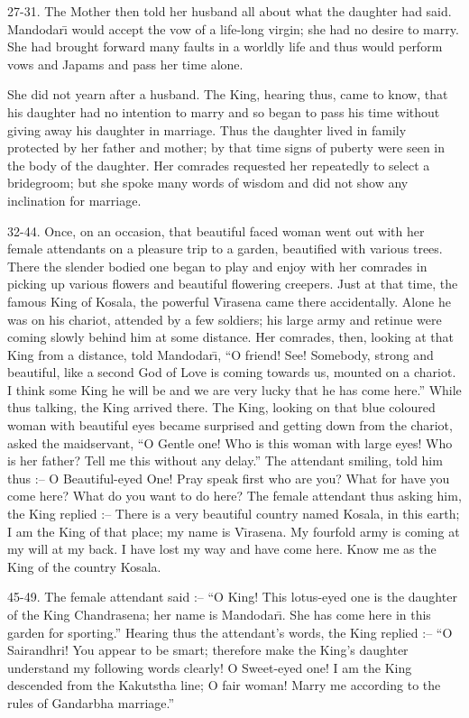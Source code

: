 27-31. The Mother then told her husband all about what the daughter had said. Mandodar\={\i} would accept the vow of a life-long virgin; she had no desire to marry. She had brought forward many faults in a worldly life and thus would perform vows and Japams and pass her time alone.

She did not yearn after a husband. The King, hearing thus, came to know, that his daughter had no intention to marry and so began to pass his time without giving away his daughter in marriage. Thus the daughter lived in family protected by her father and mother; by that time signs of puberty were seen in the body of the daughter. Her comrades requested her repeatedly to select a bridegroom; but she spoke many words of wisdom and did not show any inclination for marriage.

32-44. Once, on an occasion, that beautiful faced woman went out with her female attendants on a pleasure trip to a garden, beautified with various trees. There the slender bodied one began to play and enjoy with her comrades in picking up various flowers and beautiful flowering creepers. Just at that time, the famous King of Kosala, the powerful V\={\i}rasena came there accidentally. Alone he was on his chariot, attended by a few soldiers; his large army and retinue were coming slowly behind him at some distance. Her comrades, then, looking at that King from a distance, told Mandodar\={\i}, ``O friend! See! Somebody, strong and beautiful, like a second God of Love is coming towards us, mounted on a chariot. I think some King he will be and we are very lucky that he has come here.'' While thus talking, the King arrived there. The King, looking on that blue coloured woman with beautiful eyes became surprised and getting down from the chariot, asked the maidservant, ``O Gentle one! Who is this woman with large eyes! Who is her father? Tell me this without any delay.'' The attendant smiling, told him thus :-- O Beautiful-eyed One! Pray speak first who are you? What for have you come here? What do you want to do here? The female attendant thus asking him, the King replied :-- There is a very beautiful country named Kosala, in this earth; I am the King of that place; my name is V\={\i}rasena. My fourfold army is coming at my will at my back. I have lost my way and have come here. Know me as the King of the country Kosala.

45-49. The female attendant said :-- ``O King! This lotus-eyed one is the daughter of the King Chandrasena; her name is Mandodar\={\i}. She has come here in this garden for sporting.'' Hearing thus the attendant's words, the King replied :-- ``O Sairandhri! You appear to be smart; therefore make the King's daughter understand my following words clearly! O Sweet-eyed one! I am the King descended from the Kakutstha line; O fair woman! Marry me according to the rules of Gandarbha marriage.''

